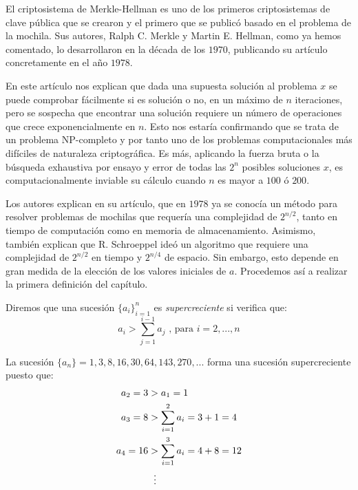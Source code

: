     El criptosistema de Merkle-Hellman es uno de los primeros criptosistemas de clave pública que se crearon y el primero que se publicó basado en el problema de la mochila. Sus autores, Ralph C. Merkle y Martin E. Hellman, como ya hemos comentado, lo desarrollaron en la década de los $1970$, publicando su artículo concretamente en el año $1978$.

    En este artículo nos explican que dada una supuesta solución al problema $x$ se puede comprobar fácilmente si es solución o no, en un máximo de $n$ iteraciones, pero se sospecha que encontrar una solución requiere un número de operaciones que crece exponencialmente en $n$. Esto nos estaría confirmando que se trata de un problema NP-completo y por tanto uno de los problemas computacionales más difíciles de naturaleza criptográfica. Es más, aplicando la fuerza bruta o la búsqueda exhaustiva por ensayo y error de todas las $2^n$ posibles soluciones $x$, es computacionalmente inviable su cálculo cuando $n$ es mayor a $100$ ó $200$.

    Los autores explican en su artículo, que en $1978$ ya se conocía un método para resolver problemas de mochilas que requería una complejidad de $2^{n/2}$, tanto en tiempo de computación como en memoria de almacenamiento. Asimismo, también explican que R. Schroeppel ideó un algoritmo que requiere una complejidad de $2^{n/2}$ en tiempo y $2^{n/4}$ de espacio. Sin embargo, esto depende en gran medida de la elección de los valores iniciales de $a$. Procedemos así a realizar la primera definición del capítulo.

    \begin{definicion} \cite{artOd}
        Diremos que una sucesión $\{a_i\}_{i=1}^{n}$ es \textit{supercreciente} si verifica que:
        \begin{equation} \label{eq:supercreciente}
            a_{i} > \sum_{j=1}^{i-1} a_{j} \text{ , para } i = 2, ... , n
        \end{equation}
    \end{definicion}

    \begin{ejemplo}
        La sucesión $\{a_{n}\} = 1, 3, 8, 16, 30, 64, 143, 270, ...$ forma una sucesión supercreciente puesto que:
        \begin{align}
            a_{2} = 3  &> a_{1} = 1 \\ 
            a_{3} = 8  &> \sum_{i=1}^{2} a_{i} = 3 + 1 = 4 \\
            a_{4} = 16 &> \sum_{i=1}^{3} a_{i} = 4 + 8 = 12 \\
            &\hspace{0.2cm}\vdots
        \end{align}
    \end{ejemplo}
    
